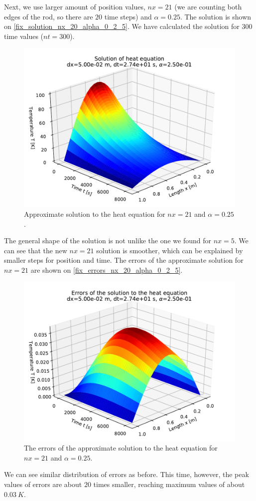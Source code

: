 Next, we use larger amount of position values, $nx = 21$ (we are counting both edges of the rod, so there are $20$ time steps) and $\alpha = 0.25$. The solution is shown on \autoref{fix_solution_nx_20_alpha_0_2_5}. We have calculated the solution for $300$ time values ($nt = 300$).
\begin{figure}[H]
  \centering
  \includegraphics[width=1.0\textwidth]{figures/solution_2_50e_01.pdf}
  \caption{Approximate solution to the heat equation for $nx=21$ and $\alpha = 0.25$.}
  \label{fix_solution_nx_20_alpha_0_2_5}
\end{figure}
The general shape of the solution is not unlike the one we found for $nx=5$. We can see that the new $nx=21$ solution is smoother, which can be explained by smaller steps for position and time. The errors of the approximate solution for $nx=21$ are shown on \autoref{fix_errors_nx_20_alpha_0_2_5}.
\begin{figure}[H]
  \centering
  \includegraphics[width=1.0\textwidth]{figures/errors_alpha_2_50e_01.pdf}
  \caption{The errors of the approximate solution to the heat equation for $nx=21$ and $\alpha = 0.25$.}
  \label{fix_errors_nx_20_alpha_0_2_5}
\end{figure}
We can see similar distribution of errors as before. This time, however, the peak values of errors are about $20$ times smaller, reaching maximum values of about $0.03 \ K$.


